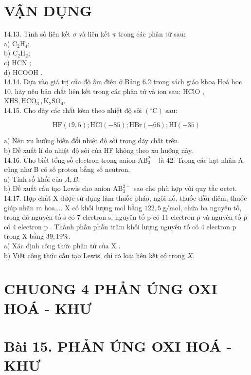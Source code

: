 \documentclass[10pt]{article}
\begin{document}
\section*{VẬN DỤNG}
14.13. Tính số liên kết $\sigma$ và liên kết $\pi$ trong các phân tử sau:\\
a) $\mathrm{C}_{2} \mathrm{H}_{4}$;\\
b) $\mathrm{C}_{2} \mathrm{H}_{2}$;\\
c) HCN ;\\
d) HCOOH .\\
14.14. Dựa vào giá trị của độ âm điện ở Bảng 6.2 trong sách giáo khoa Hoá học 10, hãy nêu bản chất liên kết trong các phân tử và ion sau: HClO , $\mathrm{KHS}, \mathrm{HCO}_{3}^{-}, \mathrm{K}_{2} \mathrm{SO}_{4}$.\\
14.15. Cho dãy các chất kèm theo nhiệt độ sôi $\left({ }^{\circ} \mathrm{C}\right)$ sau:

$$
\mathrm{HF}(19,5) ; \mathrm{HCl}(-85) ; \mathrm{HBr}(-66) ; \mathrm{HI}(-35)
$$

a) Nêu xu hướng biến đổi nhiệt độ sôi trong dãy chất trên.\\
b) Đề xuất lí do nhiệt độ sôi của HF không theo xu hướng này.\\
14.16. Cho biết tổng số electron trong anion $\mathrm{AB}_{3}^{2-}$ là 42. Trong các hạt nhân A cũng như B có số proton bằng số neutron.\\
a) Tính số khối của $A, B$.\\
b) Đề xuất cấu tạo Lewis cho anion $\mathrm{AB}_{3}^{2-}$ sao cho phù hợp với quy tắc octet.\\
14.17. Hợp chất X được sử dụng làm thuốc pháo, ngòi nổ, thuốc đầu diêm, thuốc giúp nhãn ra hoa,... X có khối lượng mol bằng $122,5 \mathrm{~g} / \mathrm{mol}$, chứa ba nguyên tố, trong đó nguyên tố s có 7 electron s, nguyên tố p có 11 electron p và nguyên tố p có 4 electron p . Thành phần phần trăm khối lượng nguyên tố có 4 electron p trong X bằng $39,19 \%$.\\
a) Xác định công thức phân tử của X .\\
b) Viết công thức cấu tạo Lewis, chỉ rõ loại liên kết có trong $X$.

\section*{CHUONG 4 PHẢN ÚNG OXI HOÁ - KHƯ}
\section*{Bài 15. PHẢN ÚNG OXI HOÁ - KHƯ}
\end{document}
